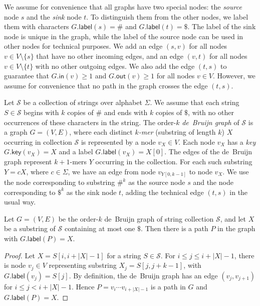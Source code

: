 \documentclass[a4paper,UKenglish]{lipics-v2016}
\newcommand{\set}[1]{\ensuremath{\{ #1 \}}}
\newcommand{\abs}[1]{\ensuremath{\lvert #1 \rvert}}
\newcommand{\gindegree}{\ensuremath{\mathsf{in}}}
\newcommand{\goutdegree}{\ensuremath{\mathsf{out}}}
\newcommand{\glabel}{\ensuremath{\mathsf{label}}}
\newcommand{\gkey}{\ensuremath{\mathsf{key}}}
\newcommand{\kmer}[1]{$#1$\nobreakdash-mer}
\newcommand{\orderk}[1]{order\nobreakdash-$#1$}
\begin{document}
We assume for convenience that all graphs have two special nodes: the \emph{source} node $s$ and the \emph{sink} node $t$. To distinguish them from the other nodes, we label them with characters $G.\glabel(s) = \#$ and $G.\glabel(t) = \$$. The label of the sink node is unique in the graph, while the label of the source node can be used in other nodes for technical purposes. We add an edge $(s, v)$ for all nodes $v \in V \setminus \set{s}$ that have no other incoming edges, and an edge $(v, t)$ for all nodes $v \in V \setminus \set{t}$ with no other outgoing edges. We also add the edge $(t, s)$ to guarantee that $G.\gindegree(v) \ge 1$ and $G.\goutdegree(v) \ge 1$ for all nodes $v \in V$. However, we assume for convenience that no path in the graph crosses the edge $(t, s)$.

Let $\mathcal{S}$ be a collection of strings over alphabet $\Sigma$. We assume that each string $S \in \mathcal{S}$ begins with $k$ copies of $\#$ and ends with $k$ copies of $\$$, with no other occurrences of these characters in the string. The \orderk{k} \emph{de~Bruijn graph} of $\mathcal{S}$ is a graph $G = (V, E)$, where each distinct \emph{\kmer{k}} (substring of length $k$) $X$ occurring in collection $\mathcal{S}$ is represented by a node $v_{X} \in V$. Each node $v_{X}$ has a \emph{key} $G.\gkey(v_{X}) = X$ and a label $G.\glabel(v_{X}) = X[0]$. The edges of the de~Bruijn graph represent \kmer{k+1}s $Y$ occurring in the collection. For each such substring $Y = cX$, where $c \in \Sigma$, we have an edge from node $v_{Y[0, k-1]}$ to node $v_{X}$. We use the node corresponding to substring $\#^{k}$ as the source node $s$ and the node corresponding to $\$^{k}$ as the sink node $t$, adding the technical edge $(t, s)$ in the usual way.

\begin{lemma}\label{lemma:dbg-fn}
Let $G = (V, E)$ be the \orderk{k} de~Bruijn graph of string collection $\mathcal{S}$, and let $X$ be a substring of $\mathcal{S}$ containing at most one $\$$. Then there is a path $P$ in the graph with $G.\glabel(P) = X$.
\end{lemma}

\begin{proof}
Let $X = S[i, i+\abs{X}-1]$ for a string $S \in \mathcal{S}$. For $i \le j \le i+\abs{X}-1$, there is node $v_{j} \in V$ representing substring $X_{j} = S[j, j+k-1]$, with $G.\glabel(v_{j}) = S[j]$. By definition, the de~Bruijn graph has an edge $(v_{j}, v_{j+1})$ for $i \le j < i+\abs{X}-1$. Hence $P = v_{i} \dotsm v_{i+\abs{X}-1}$ is a path in $G$ and $G.\glabel(P) = X$.
\end{proof}
\end{document}
